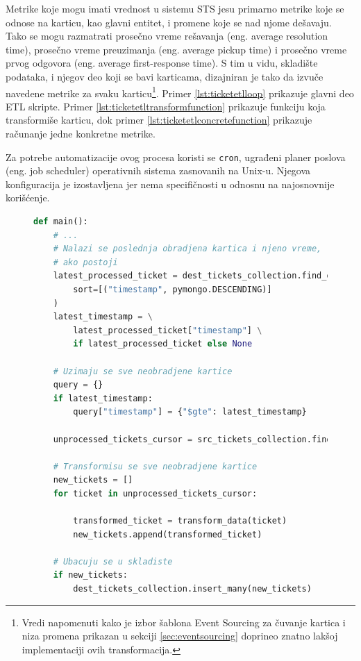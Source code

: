 \documentclass[12pt,oneside]{memoir}
\begin{document}
Metrike koje mogu imati vrednost u sistemu STS jesu primarno metrike koje se odnose na karticu, kao glavni entitet, i promene koje se nad njome dešavaju. Tako se mogu razmatrati prosečno vreme rešavanja (eng. average resolution time), prosečno vreme preuzimanja (eng. average pickup time) i prosečno vreme prvog odgovora (eng. average first-response time). S tim u vidu, skladište podataka, i njegov deo koji se bavi karticama, dizajniran je tako da izvuče navedene metrike za svaku karticu\footnote{Vredi napomenuti kako je izbor šablona Event Sourcing za čuvanje kartica i niza promena prikazan u sekciji \ref{sec:eventsourcing} doprineo znatno lakšoj implementaciji ovih transformacija.}. Primer \ref{lst:ticketetlloop} prikazuje glavni deo ETL skripte. Primer \ref{lst:ticketetltransformfunction} prikazuje funkciju koja transformiše karticu, dok primer \ref{lst:ticketetlconcretefunction} prikazuje računanje jedne konkretne metrike.

Za potrebe automatizacije ovog procesa koristi se \verb|cron|, ugrađeni planer poslova (eng. job scheduler) operativnih sistema zasnovanih na Unix-u. Njegova konfiguracija je izostavljena jer nema specifičnosti u odnosnu na najosnovnije korišćenje.

\begin{figure}[h]
\begin{lstlisting}[language=python, caption={Transformacija kartice.}, label={lst:ticketetlloop}]
def main():
    # ...
    # Nalazi se poslednja obradjena kartica i njeno vreme,
    # ako postoji
    latest_processed_ticket = dest_tickets_collection.find_one(
        sort=[("timestamp", pymongo.DESCENDING)]
    )
    latest_timestamp = \
        latest_processed_ticket["timestamp"] \
        if latest_processed_ticket else None

    # Uzimaju se sve neobradjene kartice
    query = {}
    if latest_timestamp:
        query["timestamp"] = {"$gte": latest_timestamp}

    unprocessed_tickets_cursor = src_tickets_collection.find(query)

    # Transformisu se sve neobradjene kartice
    new_tickets = []
    for ticket in unprocessed_tickets_cursor:
        
        transformed_ticket = transform_data(ticket)
        new_tickets.append(transformed_ticket)

    # Ubacuju se u skladiste
    if new_tickets:
        dest_tickets_collection.insert_many(new_tickets)
\end{lstlisting}
\end{figure}
\end{document}
